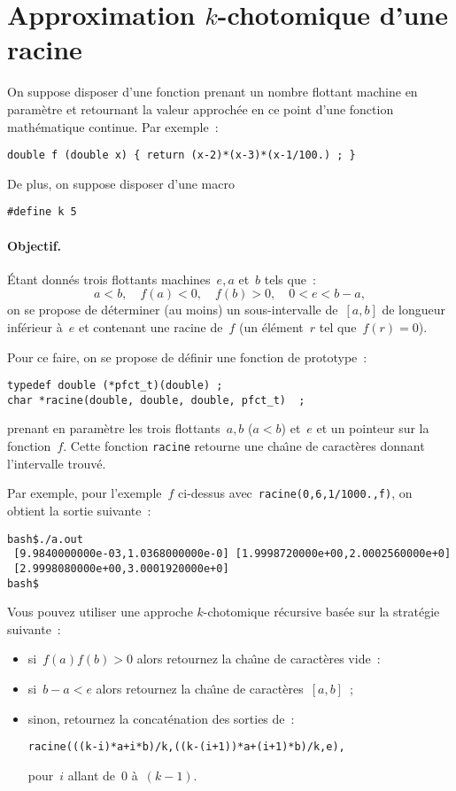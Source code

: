 \section{Approximation $k$-chotomique d'une racine}
On suppose disposer d'une fonction prenant un nombre flottant machine
en param\`etre et retournant la valeur approch\'ee en ce point d'une
fonction math\'ematique continue.  Par exemple~:
\begin{verbatim}
double f (double x) { return (x-2)*(x-3)*(x-1/100.) ; }
\end{verbatim}
De plus, on suppose disposer d'une macro
\begin{verbatim}
#define k 5
\end{verbatim}
\paragraph{Objectif.}
\'Etant donn\'es trois flottants machines~${e, a}$ et~$b$ tels que~:
\[
  a<b,\quad f(a)<0, \quad f(b) >0,\quad 0<e<b-a,
\]
on se propose de d\'eterminer (au moins) un sous-intervalle
de~${[a,b]}$ de longueur inf\'erieur \`a~$e$ et contenant une racine
de~$f$ (un \'el\'ement~$r$ tel que~${f(r)=0}$).
\par
Pour ce faire, on se propose de d\'efinir une fonction de prototype~:
\begin{verbatim}
typedef double (*pfct_t)(double) ;
char *racine(double, double, double, pfct_t)  ;
\end{verbatim}
prenant en param\`etre les trois flottants~$a,b$ (${a<b}$) et~$e$ et
un pointeur sur la fonction~$f$. Cette fonction \verb+racine+ retourne une
cha\^\i{}ne de caract\`eres donnant l'intervalle trouv\'e.
\par
Par exemple, pour l'exemple~$f$ ci-dessus
avec~\verb?racine(0,6,1/1000.,f)?,  on obtient la sortie suivante~:
\begin{verbatim}
bash$./a.out
 [9.9840000000e-03,1.0368000000e-0] [1.9998720000e+00,2.0002560000e+0]  
 [2.9998080000e+00,3.0001920000e+0] 
bash$
\end{verbatim}
Vous pouvez  utiliser
 une approche $k$-chotomique r\'ecursive bas\'ee sur la strat\'egie suivante~:
\begin{itemize}
\item si~${f(a)f(b)>0}$ alors retournez la cha\^\i{}ne de caract\`eres vide~:
\item si~${b-a<e}$ alors retournez la cha\^\i{}ne de caract\`eres~$[a,b]$~;
\item sinon, retournez la concat\'enation des sorties
  de~:
\begin{verbatim}
racine(((k-i)*a+i*b)/k,((k-(i+1))*a+(i+1)*b)/k,e),
\end{verbatim}
  pour~$i$ allant de~$0$ \`a~$(k-1)$.
\end{itemize}

